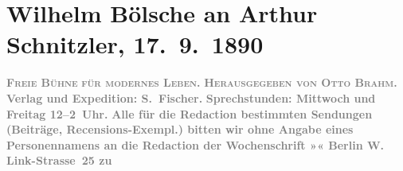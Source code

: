 

         
         \renewcommand{\erwaehntePersonen}{Personen: Otto Brahm, Wilhelm Bölsche}
         \renewcommand{\erwaehnteInstitutionen}{Institutionen: S. Fischer Verlag}
         \renewcommand{\erwaehnteOrte}{Orte: Berlin, Linkstraße, Wien}
         \renewcommand{\erwaehnteWerke}{Werke: Aus der Kaffeehausecke, Freie Bühne für modernes Leben}
               \section[Wilhelm Bölsche an Arthur Schnitzler, 17. 9. 1890]{ Wilhelm Bölsche an Arthur Schnitzler, 17. 9. 1890}\nopagebreak{}\rehead{ }\begin{ledgroupsized}[t]{13cm}\normalsize\beginnumbering{} \toendnotes[C]{\smallbreak\pagebreak[2]} 
\toendnotes[C]{\smallbreak}\pstart
           \noindent{}\centering{}{\pb}\textcolor{gray}{\textbf{\textsc{Freie Bühne}}}\pend
           \pstart
           \noindent{}\centering{}\textcolor{gray}{\textbf{\textsc{für modernes Leben.}}}\pend
           \pstart
           \noindent{}\centering{}\textcolor{gray}{\textbf{\textsc{Herausgegeben von \textbf{Otto Brahm}.}}}\pend
           \pstart
           \noindent{}\textcolor{gray}{\textbf{Verlag und Expedition: S. Fischer.}}\pend
           \pstart
           \textcolor{gray}{\textbf{Sprechstunden: Mittwoch und Freitag 12–2 Uhr.}}\pend
           \pstart
           \textcolor{gray}{\textbf{Alle für die Redaction bestimmten Sendungen (Beiträge,
                     Recensions-Exempl.) bitten wir \textbf{ohne Angabe eines
                        Personennamens} an die Redaction der Wochenschrift »« Berlin W. Link-Strasse 25 zu
}}
\end{ledgroupsized}
